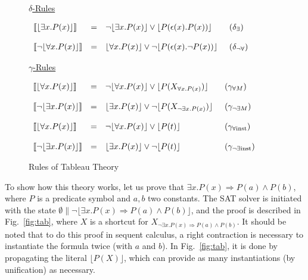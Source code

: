 \begin{figure}[t]
{\underline{$\delta$-Rules}
\begin{center}
$\begin{array}{lll@{\hspace{0.5cm}}l}
\llbracket\lfloor\exists{}x.P(x)\rfloor{}\rrbracket & = &
\neg{}\lfloor\exists{}x.P(x)\rfloor\lor\lfloor{}P(\epsilon(x).P(x))\rfloor &
(\delta_\exists)\\\\

\llbracket\neg\lfloor\forall{}x.P(x)\rfloor{}\rrbracket & = &
\lfloor\forall{}x.P(x)\rfloor\lor\neg\lfloor{}P(\epsilon(x).\neg{}P(x))\rfloor &
(\delta_{\neg\forall})
\end{array}$
\end{center}

\underline{$\gamma$-Rules}
\begin{center}
$\begin{array}{lll@{\hspace{0.5cm}}l}
\llbracket\lfloor\forall{}x.P(x)\rfloor{}\rrbracket & = &
\neg\lfloor\forall{}x.P(x)\rfloor\lor\lfloor{}P(X_{\forall{}x.P(x)})\rfloor &
(\gamma_{\forall{}M})\\\\

\llbracket\neg\lfloor\exists{}x.P(x)\rfloor{}\rrbracket & = &
\lfloor\exists{}x.P(x)\rfloor\lor
\neg\lfloor{}P(X_{\neg\exists{}x.P(x)})\rfloor &
(\gamma_{\neg\exists{}M})\\\\

\llbracket\lfloor\forall{}x.P(x)\rfloor{}\rrbracket & = &
\neg\lfloor\forall{}x.P(x)\rfloor\lor\lfloor{}P(t)\rfloor &
(\gamma_{\forall\mathrm{inst}})\\\\

\llbracket\neg\lfloor\exists{}x.P(x)\rfloor{}\rrbracket & = &
\lfloor\exists{}x.P(x)\rfloor\lor\neg\lfloor{}P(t)\rfloor &
(\gamma_{\neg\exists\mathrm{inst}})
\end{array}$
\end{center}}
\caption{Rules of Tableau Theory}
\label{fig:tabth}
\end{figure}

To show how this theory works, let us prove that
$\exists{}x.P(x)\Rightarrow{}P(a)\land{}P(b)$, where $P$ is a predicate symbol
and $a,b$ two constants. The SAT solver is initiated with the state
$\emptyset\parallel
\neg\lfloor\exists{}x.P(x)\Rightarrow{}P(a)\land{}P(b)\rfloor$, and the proof is
described in Fig.~\ref{fig:tab}, where $X$ is a shortcut for
$X_{\neg\exists{}x.P(x)\Rightarrow{}P(a)\land{}P(b)}$. It should be noted that
to do this proof in sequent calculus, a right contraction is necessary to
instantiate the formula twice (with $a$ and $b$). In Fig.~\ref{fig:tab}, it is
done by propagating the literal $\lfloor{}P(X)\rfloor{}$, which can provide as
many instantiations (by unification) as necessary.

